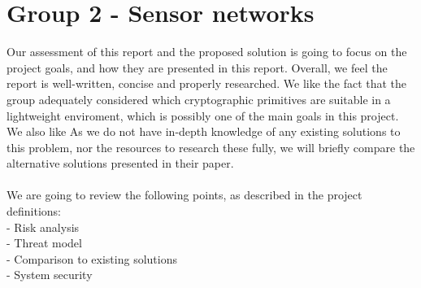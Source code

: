 \section{Group 2 - Sensor networks}

Our assessment of this report and the proposed solution is going to focus on the project goals, and how they are presented in this report.
Overall, we feel the report is well-written, concise and properly researched. We like the fact that the group adequately considered which cryptographic primitives are suitable in a lightweight enviroment, which is possibly one of the main goals in this project. We also like
As we do not have in-depth knowledge of any existing solutions to this problem, nor the resources to research these fully, we will briefly compare the alternative solutions presented in their paper.\\

\\We are going to review the following points, as described in the project definitions:
\\- Risk analysis
\\- Threat model
\\- Comparison to existing solutions
\\- System security


